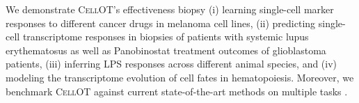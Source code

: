 We demonstrate \textsc{CellOT}'s effectiveness biopsy
(i) learning single-cell marker responses to different cancer drugs in melanoma cell lines,
(ii) predicting single-cell transcriptome responses in biopsies of patients with systemic lupus erythematosus as well as Panobinostat treatment outcomes of glioblastoma patients,
(iii) inferring LPS responses across different animal species,
and (iv) modeling the transcriptome evolution of cell fates in hematopoiesis.
Moreover, we benchmark \textsc{CellOT} against current state-of-the-art methods on multiple tasks \cite{Lopez2018scvi, lotfollahi2019scgen}.
